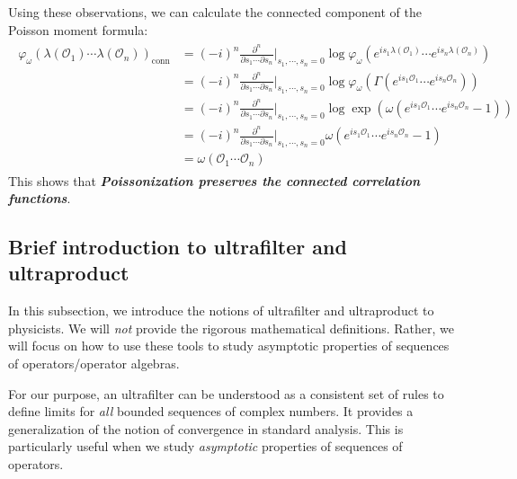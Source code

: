 \documentclass[a4paper,11pt]{article}
\theoremstyle{definition}
\numberwithin{equation}{section}
\begin{document}
Using these observations, we can calculate the connected component of the Poisson moment formula:
\begin{align}
    \begin{split}
        \varphi_\omega(\lambda(\mathcal{O}_1)\cdots\lambda(\mathcal{O}_n))_\text{conn}&=(-i)^n\frac{\partial^n}{\partial s_1\cdots\partial s_n}|_{s_1,\cdots,s_n = 0}\log\varphi_\omega(e^{is_1\lambda(\mathcal{O}_1)}\cdots e^{is_n\lambda(\mathcal{O}_n)})
        \\
        &=(-i)^n\frac{\partial^n}{\partial s_1\cdots\partial s_n}|_{s_1,\cdots,s_n = 0}\log \varphi_\omega(\Gamma(e^{is_1\mathcal{O}_1}\cdots e^{is_n\mathcal{O}_n}))
        \\
        &=(-i)^n\frac{\partial^n}{\partial s_1\cdots\partial s_n}|_{s_1,\cdots,s_n = 0}\log\exp(\omega(e^{is_1\mathcal{O}_1}\cdots e^{is_n\mathcal{O}_n} - 1))
        \\&=(-i)^n\frac{\partial^n}{\partial s_1\cdots\partial s_n}|_{s_1,\cdots,s_n = 0}\omega(e^{is_1\mathcal{O}_1}\cdots e^{is_n\mathcal{O}_n} - 1)
        \\&=\omega(\mathcal{O}_1\cdots\mathcal{O}_n)
    \end{split}
\end{align}
This shows that \textbf{\textit{Poissonization preserves the connected correlation functions}}.



\subsection{Brief introduction to ultrafilter and ultraproduct}\label{appendix:ultra}

In this subsection, we introduce the notions of ultrafilter and ultraproduct to physicists. We will \textit{not} provide the rigorous mathematical definitions. Rather, we will focus on how to use these tools to study asymptotic properties of sequences of operators/operator algebras. 

For our purpose, an ultrafilter can be understood as a consistent set of rules to define limits for \textit{all} bounded sequences of complex numbers. It provides a generalization of the notion of convergence in standard analysis. This is particularly useful when we study \textit{asymptotic} properties of sequences of operators.
\end{document}
